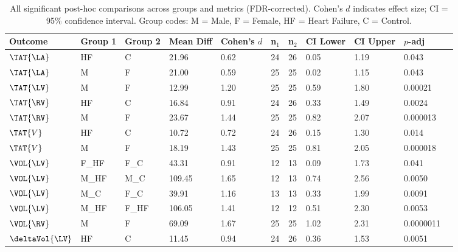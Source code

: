 
\begin{landscape}
\begin{table}[ht]
\centering
\caption{All significant post-hoc comparisons across groups and metrics
(FDR-corrected). Cohen's $d$ indicates effect size; CI = 95\% confidence
interval. Group codes: M = Male, F = Female, HF = Heart Failure, C = Control.}
\begin{tabular}{lllllllllll}
\toprule
\textbf{Outcome} & \textbf{Group 1} & \textbf{Group 2} &
    \textbf{Mean Diff} & \textbf{Cohen's $d$} &
    \textbf{n$_1$} & \textbf{n$_2$} &
    \textbf{CI Lower} & \textbf{CI Upper} & \textbf{$p$-adj} \\
\midrule
$\TAT{\LA}$         & HF    & C     & 21.96 & 0.62  & 24 & 26 & 0.05  & 1.19 & 0.043    \\
$\TAT{\LA}$         & M     & F     & 21.00 & 0.59  & 25 & 25 & 0.02  & 1.15 & 0.043    \\
$\TAT{\LV}$         & M     & F     & 12.99 & 1.20  & 25 & 25 & 0.59  & 1.80 & 0.00021  \\
$\TAT{\RV}$         & HF    & C     & 16.84 & 0.91  & 24 & 26 & 0.33  & 1.49 & 0.0024   \\
$\TAT{\RV}$         & M     & F     & 23.67 & 1.44  & 25 & 25 & 0.82  & 2.07 & 0.000013 \\
$\TAT{V}$           & HF    & C     & 10.72 & 0.72  & 24 & 26 & 0.15  & 1.30 & 0.014    \\
$\TAT{V}$           & M     & F     & 18.19 & 1.43  & 25 & 25 & 0.81  & 2.05 & 0.000018 \\
$\VOL{\LV}$         & F\_HF & F\_C  & 43.31 & 0.91  & 12 & 13 & 0.09  & 1.73 & 0.041    \\
$\VOL{\LV}$         & M\_HF & M\_C  & 109.45 & 1.65 & 12 & 13 & 0.74  & 2.56 & 0.0050   \\
$\VOL{\LV}$         & M\_C  & F\_C  & 39.91 & 1.16  & 13 & 13 & 0.33  & 1.99 & 0.0091   \\
$\VOL{\LV}$         & M\_HF & F\_HF & 106.05 & 1.41 & 12 & 12 & 0.51  & 2.30 & 0.0053   \\
$\VOL{\RV}$         & M     & F     & 69.09 & 1.67  & 25 & 25 & 1.02  & 2.31 & 0.0000011 \\
$\deltaVol{\LV}$    & HF    & C     & 11.45 & 0.94  & 24 & 26 & 0.36  & 1.53 & 0.0051   \\

\end{tabular}
\end{table}
\end{landscape}
